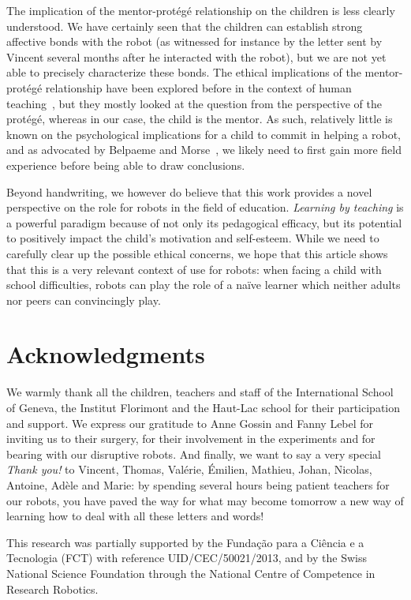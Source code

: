 \documentclass{article}
\begin{document}
The implication of the mentor-protégé relationship on the children is less
clearly understood. We have certainly seen that the children can establish
strong affective bonds with the robot (as witnessed for instance by the letter
sent by Vincent several months after he interacted with the robot), but we are
not yet able to precisely characterize these bonds. The ethical implications of
the mentor-protégé relationship have been explored before in the context of
human teaching~\cite{brad1999mentor,wendelyn2008context}, but they mostly looked
at the question from the perspective of the protégé, whereas in our case, the
child is the mentor. As such, relatively little is known on the psychological
implications for a child to commit in helping a robot, and as advocated by
Belpaeme and Morse~\cite{belpaeme2010time}, we likely need to first gain more
field experience before being able to draw conclusions.

Beyond handwriting, we however do believe that this work provides a novel
perspective on the role for robots in the field of education. \emph{Learning by
teaching} is a powerful paradigm because of not only its pedagogical efficacy,
but its potential to positively impact the child's motivation and self-esteem.
While we need to carefully clear up the possible ethical concerns, we hope that
this article shows that this is a very relevant context of use for robots: when
facing a child with school difficulties, robots can play the role of a naïve
learner which neither adults nor peers can convincingly play.


\section*{Acknowledgments}

We warmly thank all the children, teachers and staff of the International School
of Geneva, the Institut Florimont and the Haut-Lac school for their
participation and support. We express our gratitude to Anne Gossin and Fanny
Lebel for inviting us to their surgery, for their involvement in the experiments
and for bearing with our disruptive robots. And finally, we want to say a very
special \emph{Thank you!} to Vincent, Thomas, Valérie, Émilien, Mathieu, Johan,
Nicolas, Antoine, Adèle and Marie: by spending several hours being patient
teachers for our robots, you have paved the way for what may become tomorrow a
new way of learning how to deal with all these letters and words!

This research was partially supported by the Funda\c{c}\~{a}o para a Ci\^{e}ncia
e a Tecnologia (FCT) with reference UID/CEC/50021/2013, and by the Swiss
National Science Foundation through the National Centre of Competence in
Research Robotics.



\end{document}
